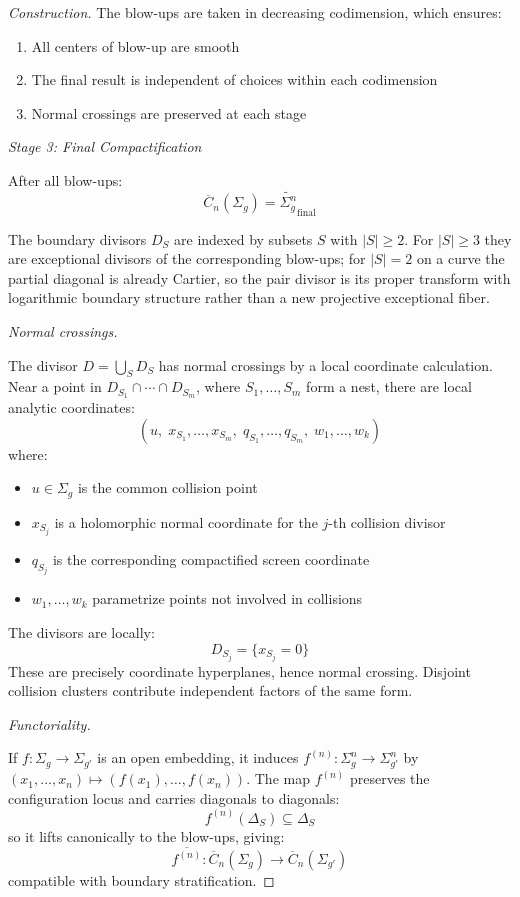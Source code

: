 \begin{proof}[Construction]
The blow-ups are taken in decreasing codimension, which ensures:
\begin{enumerate}
\item All centers of blow-up are smooth
\item The final result is independent of choices within each codimension
\item Normal crossings are preserved at each stage
\end{enumerate}

\medskip
\noindent\emph{Stage 3: Final Compactification}

After all blow-ups:
\[\overline{C}_n(\Sigma_g) = \widetilde{\Sigma_g^n}_{\text{final}}\]

The boundary divisors $D_S$ are indexed by subsets $S$ with
$|S|\geq2$. For $|S|\geq3$ they are exceptional divisors of the
corresponding blow-ups; for $|S|=2$ on a curve the partial diagonal is
already Cartier, so the pair divisor is its proper transform with
logarithmic boundary structure rather than a new projective exceptional
fiber.

\medskip
\noindent\emph{Normal crossings.}

The divisor $D = \bigcup_S D_S$ has normal crossings by a local
coordinate calculation. Near a point in
$D_{S_1} \cap \cdots \cap D_{S_m}$, where
$S_1, \ldots, S_m$ form a nest, there are local analytic coordinates:
\[
(u,\;x_{S_1},\ldots,x_{S_m},\;q_{S_1},\ldots,q_{S_m},\;w_1,\ldots,w_k)
\]
where:
\begin{itemize}
\item $u \in \Sigma_g$ is the common collision point
\item $x_{S_j}$ is a holomorphic normal coordinate for the $j$-th
collision divisor
\item $q_{S_j}$ is the corresponding compactified screen coordinate
\item $w_1, \ldots, w_k$ parametrize points not involved in collisions
\end{itemize}

The divisors are locally:
\[D_{S_j} = \{x_{S_j} = 0\}\]
These are precisely coordinate hyperplanes, hence normal crossing.
Disjoint collision clusters contribute independent factors of the same
form.

\medskip
\noindent\emph{Functoriality.}

If $f: \Sigma_g \to \Sigma_{g'}$ is an open embedding, it induces
$f^{(n)}: \Sigma_g^n \to \Sigma_{g'}^n$ by
$(x_1,\ldots,x_n) \mapsto (f(x_1),\ldots,f(x_n))$. The map
$f^{(n)}$ preserves the configuration locus and carries diagonals to
diagonals:
\[f^{(n)}(\Delta_S) \subseteq \Delta_S\]
so it lifts canonically to the blow-ups, giving:
\[\overline{f^{(n)}}: \overline{C}_n(\Sigma_g) \to \overline{C}_n(\Sigma_{g'})\]
compatible with boundary stratification.
\end{proof}

